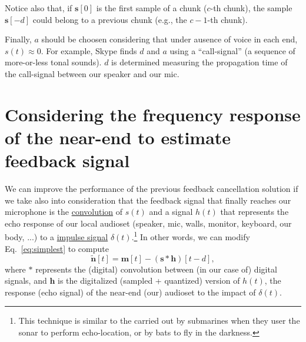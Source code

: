 Notice also that, if ${\mathbf s}[0]$ is the first sample of a chunk
($c$-th chunk), the sample ${\mathbf s}[-d]$ could belong to a
previous chunk (e.g., the $c-1$-th chunk).

Finally, $a$ should be choosen considering that under ausence of voice
in each end, $s(t)\approx 0$. For example, Skype finds $d$ and $a$
using a ``call-signal'' (a sequence of more-or-less tonal sounds). $d$
is determined measuring the propagation time of the call-signal
between our speaker and our mic.

\section{Considering the frequency response of the near-end to estimate feedback signal}
We can improve the performance of the previous feedback cancellation
solution if we take also into consideration that the feedback signal
that finally reaches our microphone is the
\href{https://en.wikipedia.org/wiki/Convolution}{convolution} of
$s(t)$ and a signal $h(t)$ that represents the echo response of our
local audioset (speaker, mic, walls, monitor, keyboard, our body, ...)
to a \href{https://en.wikipedia.org/wiki/Impulse_response}{impulse
  signal} $\delta(t)$.\footnote{This technique is similar to the
  carried out by submarines when they user the sonar to perform
  echo-location, or by bats to fly in the darkness.} In other words,
we can modify Eq.~\eqref{eq:simplest} to compute
\begin{equation}
 \tilde{\mathbf n}[t] = {\mathbf m}[t] - ({\mathbf s}\ast{\mathbf h})[t-d],
  \label{eq:using_convolution}
\end{equation}
where $\ast$ represents the (digital) convolution between (in our case
of) digital signals, and ${\mathbf h}$ is the digitalized (sampled +
quantized) version of $h(t)$, the response (echo signal) of the near-end
(our) audioset to the impact of $\delta(t)$.

